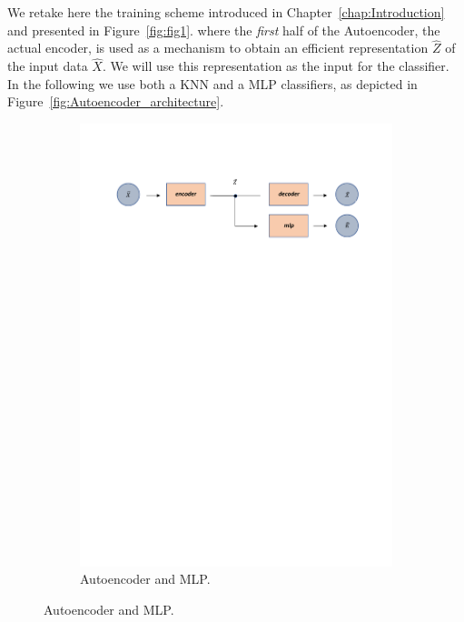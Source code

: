 We retake here the training scheme introduced in Chapter~\ref{chap:Introduction} and presented in Figure~\ref{fig:fig1}. where the \emph{first} half of the Autoencoder, the actual encoder, is used as a mechanism to obtain an efficient representation $\hat Z$ of the input data $\hat X$. 
%
We will use this representation  as the input for the classifier. 
%
In the following we use both a KNN and a MLP classifiers, as depicted in Figure~\ref{fig:Autoencoder_architecture}. 
%
\begin{figure}[H]
\begin{subfigure}{1\linewidth}  
 \centering
  \includegraphics[width=\linewidth]{Figuras_tfg/Diagram_auto_mlp}
  \caption{Autoencoder and MLP.}
  \label{fig:FigA_Autoencoder_MLP} 
\end{subfigure}


\end{figure}
